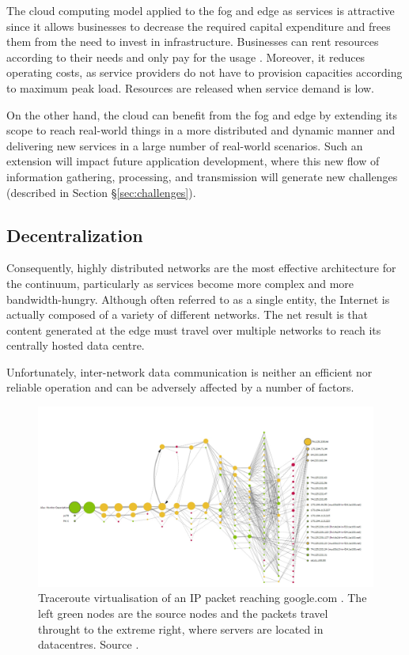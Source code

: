 The cloud computing model applied to the fog and edge as services is attractive since it allows businesses to decrease the required capital expenditure and frees them from the need to invest in infrastructure. Businesses can rent resources according to their needs and only pay for the usage \cite{botta2016integration}. Moreover, it reduces operating costs, as service providers do not have to provision capacities according to maximum peak load. Resources are released when service demand is low.

On the other hand, the cloud can benefit from the fog and edge by extending its scope to reach real-world things in a more distributed and dynamic manner and delivering new services in a large number of real-world scenarios. Such an extension will impact future application development, where this new flow of information gathering, processing, and transmission will generate new challenges (described in Section §\ref{sec:challenges}).

\subsection{Decentralization}

Consequently, highly distributed networks are the most effective architecture for the continuum, particularly as services become more complex and more bandwidth-hungry. Although often referred to as a single entity, the Internet is actually composed of a variety of different networks. The net result is that content generated at the edge must travel over multiple networks to reach its centrally hosted data centre.

Unfortunately, inter-network data communication is neither an efficient nor reliable operation and can be adversely affected by a number of factors.

\begin{figure}[ht]
\centering
\includegraphics[width=\columnwidth]{figures/traceroute}
\caption{Traceroute virtualisation of an IP packet reaching google.com \label{fig:traceroute}. The left green nodes are the source nodes and the packets travel throught to the extreme right, where servers are located in datacentres. Source \cite{traceroute-google}.}
\end{figure}

